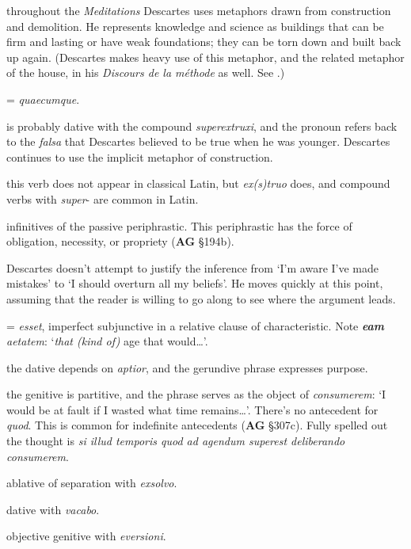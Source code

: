  throughout the \textit{Meditations} Descartes uses metaphors drawn from construction and demolition. He represents knowledge and science as buildings that can be firm and lasting or have weak foundations; they can be torn down and built back up again. (Descartes makes heavy use of this metaphor, and the related metaphor of the house, in his \textit{Discours de la méthode} as well. See \citet[22]{curtis1984}.)

 = \textit{quaecumque}.

 is probably dative with the compound \textit{superextruxi}, and the pronoun refers back to the \textit{falsa} that Descartes believed to be true when he was younger. Descartes continues to use the implicit metaphor of construction.

 this verb does not appear in classical Latin, but \textit{ex(s)truo} does, and compound verbs with \textit{super}- are common in Latin.

 infinitives of the passive periphrastic. This periphrastic has the force of obligation, necessity, or propriety (\textbf{AG} §194b).

 Descartes doesn't attempt to justify the inference from `I'm aware I've made mistakes' to `I should overturn all my beliefs'. He moves quickly at this point, assuming that the reader is willing to go along to see where the argument leads. 

 = \textit{esset}, imperfect subjunctive in a relative clause of characteristic. Note \textit{\textbf{eam} aetatem}: `\textit{that (kind of)} age that would\dots'.

 the dative depends on \textit{aptior}, and the gerundive phrase expresses purpose.

 the genitive is partitive, and the phrase serves as the object of \textit{consumerem}: `I would be at fault if I wasted what time remains\dots'. There's no antecedent for \textit{quod}. This is common for indefinite antecedents (\textbf{AG} §307c). Fully spelled out the thought is \textit{si illud temporis quod ad agendum superest deliberando consumerem}.

 ablative of separation with \textit{exsolvo}.

 dative with \textit{vacabo}.

 objective genitive with \textit{eversioni}.

